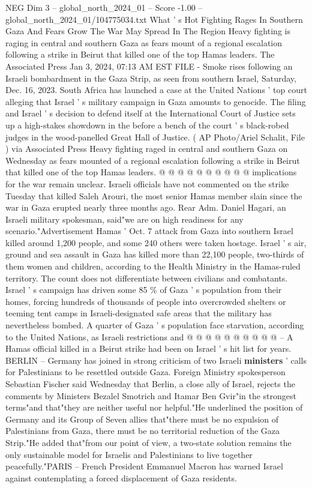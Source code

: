 \begin{textsample}{NEG Dim 3 – global\_north\_2024\_01 – Score -1.00 – global\_north\_2024\_01/104775034.txt}  \label{ex:f3_neg_217}
What ' s Hot Fighting Rages In Southern Gaza And Fears Grow The War May Spread In The Region Heavy fighting is raging in central and southern Gaza as fears mount of a regional escalation following a strike in Beirut that killed one of the top Hamas leaders.
The Associated Press Jan 3, 2024, 07:13 AM EST FILE - Smoke rises following an Israeli bombardment in the Gaza Strip, as seen from southern Israel, Saturday, Dec. 16, 2023.
South Africa has launched a case at the United Nations ' top court alleging that Israel ' s military campaign in Gaza amounts to genocide.
The filing and Israel ' s decision to defend itself at the International Court of Justice sets up a high-stakes showdown in the before a bench of the court ' s black-robed judges in the wood-panelled Great Hall of Justice. ( AP Photo/Ariel Schalit, File ) via Associated Press Heavy fighting raged in central and southern Gaza on Wednesday as fears mounted of a regional escalation following a strike in Beirut that killed one of the top Hamas leaders. @ @ @ @ @ @ @ @ @ @ implications for the war remain unclear.
Israeli officials have not commented on the strike Tuesday that killed Saleh Arouri, the most senior Hamas member slain since the war in Gaza erupted nearly three months ago.
Rear Adm.
Daniel Hagari, an Israeli military spokesman, said"we are on high readiness for any scenario."Advertisement Hamas ' Oct. 7 attack from Gaza into southern Israel killed around 1,200 people, and some 240 others were taken hostage.
Israel ' s air, ground and sea assault in Gaza has killed more than 22,100 people, two-thirds of them women and children, according to the Health Ministry in the Hamas-ruled territory.
The count does not differentiate between civilians and combatants.
Israel ' s campaign has driven some 85 \% of Gaza ' s population from their homes, forcing hundreds of thousands of people into overcrowded shelters or teeming tent camps in Israeli-designated safe areas that the military has nevertheless bombed.
A quarter of Gaza ' s population face starvation, according to the United Nations, as Israeli restrictions and @ @ @ @ @ @ @ @ @ @ -- A Hamas official killed in a Beirut strike had been on Israel ' s hit list for years.
BERLIN -- Germany has joined in strong criticism of two Israeli \textbf{ministers} ' calls for Palestinians to be resettled outside Gaza.
Foreign Ministry spokesperson Sebastian Fischer said Wednesday that Berlin, a close ally of Israel, rejects the comments by Ministers Bezalel Smotrich and Itamar Ben Gvir"in the strongest terms"and that"they are neither useful nor helpful."He underlined the position of Germany and its Group of Seven allies that"there must be no expulsion of Palestinians from Gaza, there must be no territorial reduction of the Gaza Strip."He added that"from our point of view, a two-state solution remains the only sustainable model for Israelis and Palestinians to live together peacefully."PARIS -- French President Emmanuel Macron has warned Israel against contemplating a forced displacement of Gaza residents.

\end{textsample}
